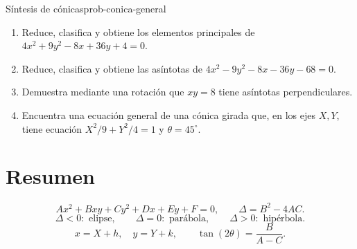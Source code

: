 \begin{problem}{Síntesis de cónicas}{prob-conica-general}
\begin{enumerate}
  \item Reduce, clasifica y obtiene los elementos principales de
  $4x^2+9y^2-8x+36y+4=0$.
  \item Reduce, clasifica y obtiene las asíntotas de
  $4x^2-9y^2-8x-36y-68=0$.
  \item Demuestra mediante una rotación que $xy=8$ tiene asíntotas
  perpendiculares.
  \item Encuentra una ecuación general de una cónica girada que, en los ejes
  $X,Y$, tiene ecuación $X^2/9+Y^2/4=1$ y $\theta=45^\circ$.
\end{enumerate}
\end{problem}

\section*{Resumen}
\begin{properties}
\[
Ax^2+Bxy+Cy^2+Dx+Ey+F=0,
\qquad
\Delta=B^2-4AC.
\]
\[
\Delta<0:\text{ elipse},\qquad
\Delta=0:\text{ parábola},\qquad
\Delta>0:\text{ hipérbola}.
\]
\[
x=X+h,\quad y=Y+k,
\qquad
\tan(2\theta)=\frac{B}{A-C}.
\]
\end{properties}

